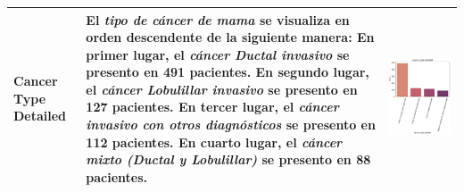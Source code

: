 \begin{table}[!htb]
\begin{threeparttable}
\begin{tabular}{p{2.5cm} p{7.5cm} p{6.5cm}}
			\\ \hline
			Cancer Type Detailed
			& El \textit{tipo de cáncer de mama} se visualiza en orden descendente de la siguiente manera: En primer lugar, el \textit{cáncer Ductal invasivo} se presento en 491 pacientes. En segundo  lugar, el \textit{cáncer Lobulillar invasivo} se presento en 127 pacientes. En tercer lugar, el \textit{cáncer invasivo con otros diagnósticos} se presento en 112 pacientes. En cuarto lugar,  el \textit{cáncer mixto (Ductal y Lobulillar)} se presento en 88 pacientes.
			
			& \begin{center}\includegraphics[width=1\linewidth]{NOTEBOOK/IMAGENES_DESCRIPTIVAS/6_cancer_type_detailed}\end{center}
			\\ \hline
		\end{tabular}
	\end{threeparttable}
\end{table}

